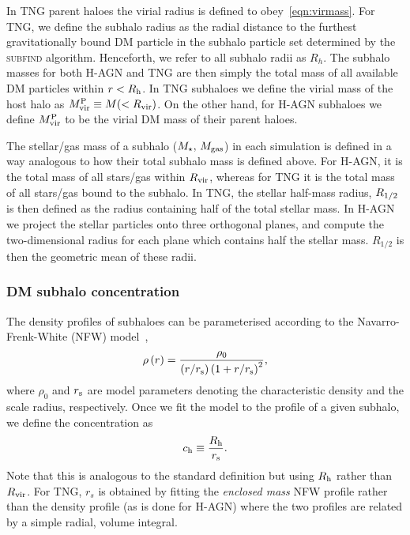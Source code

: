 \documentclass[useAMS,usenatbib]{mnras}
\begin{document}
In TNG parent haloes the virial radius is defined to obey~\cref{eqn:virmass}. For TNG, we define the subhalo radius as the radial distance to the furthest gravitationally bound DM particle in the subhalo particle set determined by the \textsc{subfind} algorithm. Henceforth, we refer to all subhalo radii as $R_h$. The subhalo masses for both H-AGN and TNG are then simply the total mass of all available DM particles within $r < R_{\rm h}$.
In TNG subhaloes we define the virial mass of the host halo as $M_{\rm vir}^{\rm P} \equiv M(<R_{\rm vir})$. On the other hand, for H-AGN subhaloes we define $M_{\rm vir}^{\rm P}$ to be the virial DM mass of their parent haloes.


The stellar/gas mass of a subhalo ($M_\star,\,M_{\rm gas}$) in each simulation is defined in a way analogous to how their total subhalo mass is defined above. For H-AGN, it is the total mass of all stars/gas within $R_{\rm vir}$, whereas for TNG it is the total mass of all stars/gas bound to the subhalo. In TNG, the stellar half-mass radius, $R_{\rm 1/2}$ is then defined as the radius containing half of the total stellar mass. In H-AGN we project the stellar particles onto three orthogonal planes, and compute the two-dimensional radius for each plane which contains half the stellar mass. $R_{1/2}$ is then the geometric mean of these radii.


\subsubsection{\Acl{DM} subhalo concentration}\label{sec:halo_concentration}

The density profiles of subhaloes can be parameterised according to the Navarro-Frenk-White (NFW) model~\citep{Navarro_1996},
\begin{equation}
\label{eq:nfw_profile}
	\rho \left( r \right) = \frac{\rho_0}{\left( r / r_{\rm s} \right) \left( 1 + r / r_{\rm s} \right)^{2}},
\end{equation}
where $\rho_0$ and $r_{\rm s}$ are model parameters denoting the characteristic density and the scale radius, respectively. Once we fit the model to the profile of a given subhalo, we define the concentration as
\begin{equation}
    c_{\rm h} \equiv \frac{R_{\rm h}}{r_{\rm s}}.
\end{equation}
Note that this is analogous to the standard definition but using $R_{\rm h}$ rather than $R_{\rm vir}$. For TNG, $r_s$ is obtained by fitting the \emph{enclosed mass} NFW profile rather than the density profile (as is done for H-AGN) where the two profiles are related by a simple radial, volume integral.
\end{document}
